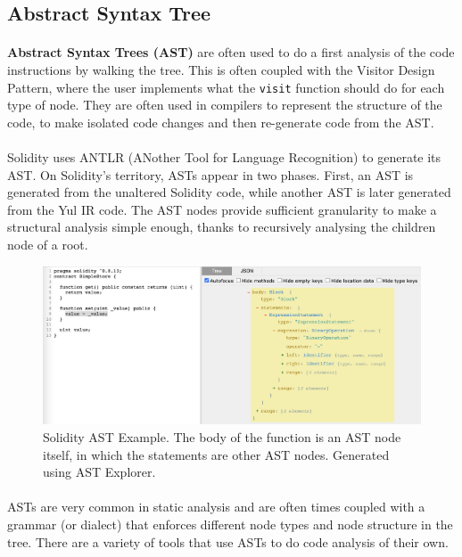 \subsection*{Abstract Syntax Tree}
\paragraph*{}
\textbf{Abstract Syntax Trees (AST)} are often used to do a first analysis of the code instructions by walking the tree. This is often coupled with the Visitor Design Pattern, where the user implements what the \lstinline[columns=fixed]{visit} function should do for each type of node. They are often used in compilers to represent the structure of the code, to make isolated code changes and then re-generate code from the AST.

\paragraph*{}
Solidity uses ANTLR (ANother Tool for Language Recognition) to generate its AST. On Solidity's territory, ASTs appear in two phases. First, an AST is generated from the unaltered Solidity code, while another AST is later generated from the Yul IR code. The AST nodes provide sufficient granularity to make a structural analysis simple enough, thanks to recursively analysing the children node of a root.

\begin{figure}
    \centering
    \includegraphics[width=15cm]{images/solidity_ast_example.png}
    \caption{Solidity AST Example. The body of the function is an AST node itself, in which the statements are other AST nodes. Generated using AST Explorer.}
    \label{fig:solidity-ast-example}
\end{figure}

\paragraph*{}
ASTs are very common in static analysis and are often times coupled with a grammar (or dialect) that enforces different node types and node structure in the tree. There are a variety of tools that use ASTs to do code analysis of their own.

